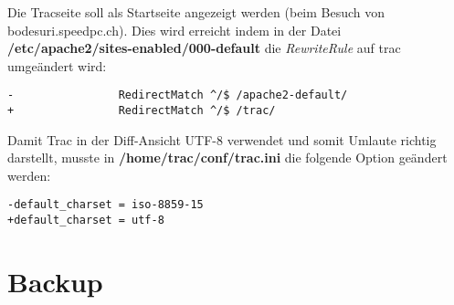 \documentclass[12pt,halfparskip]{scrreprt}
\begin{document}
Die Tracseite soll als Startseite angezeigt werden (beim Besuch von bodesuri.speedpc.ch). Dies wird erreicht indem in der Datei \textbf{/etc/apache2/sites-enabled/000-default} die \emph{RewriteRule} auf trac umgeändert wird:

\begin{verbatim}
-                RedirectMatch ^/$ /apache2-default/
+                RedirectMatch ^/$ /trac/
\end{verbatim}

Damit Trac in der Diff-Ansicht UTF-8 verwendet und somit Umlaute richtig darstellt, musste in \textbf{/home/trac/conf/trac.ini} die folgende Option geändert werden:

\begin{verbatim}
-default_charset = iso-8859-15
+default_charset = utf-8
\end{verbatim}


\chapter{Backup} %
\label{cha:backup}

\end{document}
